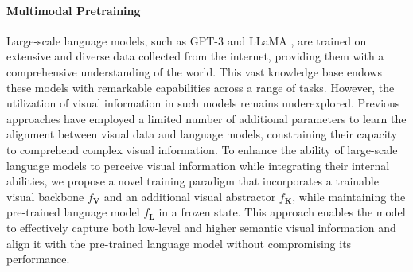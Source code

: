 \documentclass{article}
\begin{document}
\paragraph{Multimodal Pretraining}
Large-scale language models, such as GPT-3 \citep{gpt3} and LLaMA \citep{llama}, are trained on extensive and diverse data collected from the internet, providing them with a comprehensive understanding of the world. This vast knowledge base endows these models with remarkable capabilities across a range of tasks. However, the utilization of visual information in such models remains underexplored. Previous approaches \citep{minigpt4, llava} have employed a limited number of additional parameters to learn the alignment between visual data and language models, constraining their capacity to comprehend complex visual information. To enhance the ability of large-scale language models to perceive visual information while integrating their internal abilities, we propose a novel training paradigm that incorporates a trainable visual backbone $f_{\mathbf{V}}$ and an additional visual abstractor $f_{\mathbf{K}}$, while maintaining the pre-trained language model $f_{\mathbf{L}}$ in a frozen state. This approach enables the model to effectively capture both low-level and higher semantic visual information and align it with the pre-trained language model without compromising its performance.
\end{document}
